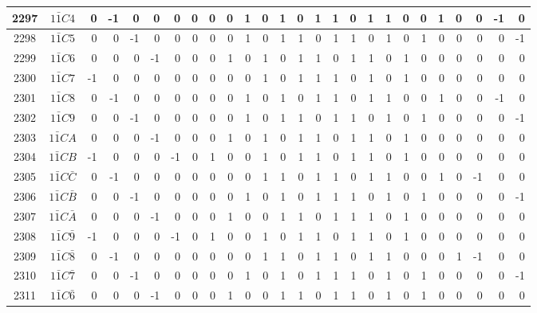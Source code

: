 \documentclass[12 pt]{article}%
\begin{document}
\begin{tiny}
\begin{centering}
\begin{longtable}{|c|c||rrrrrrrrrrrrrrrrrrrrrrrr|}
      \hline
      2297 & $1\bar1C4$ & 0 & -1 & 0 & 0 & 0 & 0 & 0 & 0 & 1 & 0 & 1 & 0 & 1 & 1 & 0 & 1 & 1 & 0 & 0 & 1 & 0 & 0 & -1 & 0 \\
      \hline
      2298 & $1\bar1C5$ & 0 & 0 & -1 & 0 & 0 & 0 & 0 & 0 & 1 & 0 & 1 & 1 & 0 & 1 & 1 & 0 & 1 & 0 & 1 & 0 & 0 & 0 & 0 & -1 \\
      \hline
      2299 & $1\bar1C6$ & 0 & 0 & 0 & -1 & 0 & 0 & 0 & 1 & 0 & 1 & 0 & 1 & 1 & 0 & 1 & 1 & 0 & 1 & 0 & 0 & 0 & 0 & 0 & 0 \\
      \hline
      2300 & $1\bar1C7$ & -1 & 0 & 0 & 0 & 0 & 0 & 0 & 0 & 0 & 1 & 0 & 1 & 1 & 1 & 0 & 1 & 0 & 1 & 0 & 0 & 0 & 0 & 0 & 0 \\
      \hline
      2301 & $1\bar1C8$ & 0 & -1 & 0 & 0 & 0 & 0 & 0 & 0 & 1 & 0 & 1 & 0 & 1 & 1 & 0 & 1 & 1 & 0 & 0 & 1 & 0 & 0 & -1 & 0 \\
      \hline
      2302 & $1\bar1C9$ & 0 & 0 & -1 & 0 & 0 & 0 & 0 & 0 & 1 & 0 & 1 & 1 & 0 & 1 & 1 & 0 & 1 & 0 & 1 & 0 & 0 & 0 & 0 & -1 \\
      \hline
      2303 & $1\bar1CA$ & 0 & 0 & 0 & -1 & 0 & 0 & 0 & 1 & 0 & 1 & 0 & 1 & 1 & 0 & 1 & 1 & 0 & 1 & 0 & 0 & 0 & 0 & 0 & 0 \\
      \hline
      2304 & $1\bar1CB$ & -1 & 0 & 0 & 0 & -1 & 0 & 1 & 0 & 0 & 1 & 0 & 1 & 1 & 0 & 1 & 1 & 0 & 1 & 0 & 0 & 0 & 0 & 0 & 0 \\
      \hline
      2305 & $1\bar1C\bar C$ & 0 & -1 & 0 & 0 & 0 & 0 & 0 & 0 & 0 & 1 & 1 & 0 & 1 & 1 & 0 & 1 & 1 & 0 & 0 & 1 & 0 & -1 & 0 & 0 \\
      \hline
      2306 & $1\bar1C\bar B$ & 0 & 0 & -1 & 0 & 0 & 0 & 0 & 0 & 1 & 0 & 1 & 0 & 1 & 1 & 1 & 0 & 1 & 0 & 1 & 0 & 0 & 0 & 0 & -1 \\
      \hline
      2307 & $1\bar1C\bar A$ & 0 & 0 & 0 & -1 & 0 & 0 & 0 & 1 & 0 & 0 & 1 & 1 & 0 & 1 & 1 & 1 & 0 & 1 & 0 & 0 & 0 & 0 & 0 & 0 \\
      \hline
      2308 & $1\bar1C\bar9$ & -1 & 0 & 0 & 0 & -1 & 0 & 1 & 0 & 0 & 1 & 0 & 1 & 1 & 0 & 1 & 1 & 0 & 1 & 0 & 0 & 0 & 0 & 0 & 0 \\
      \hline
      2309 & $1\bar1C\bar8$ & 0 & -1 & 0 & 0 & 0 & 0 & 0 & 0 & 0 & 1 & 1 & 0 & 1 & 1 & 0 & 1 & 1 & 0 & 0 & 0 & 1 & -1 & 0 & 0 \\
      \hline
      2310 & $1\bar1C\bar7$ & 0 & 0 & -1 & 0 & 0 & 0 & 0 & 0 & 1 & 0 & 1 & 0 & 1 & 1 & 1 & 0 & 1 & 0 & 1 & 0 & 0 & 0 & 0 & -1 \\
      \hline
      2311 & $1\bar1C\bar6$ & 0 & 0 & 0 & -1 & 0 & 0 & 0 & 1 & 0 & 0 & 1 & 1 & 0 & 1 & 1 & 0 & 1 & 0 & 1 & 0 & 0 & 0 & 0 & 0 \\

\end{longtable}
\end{centering}
\end{tiny}
\end{document}
